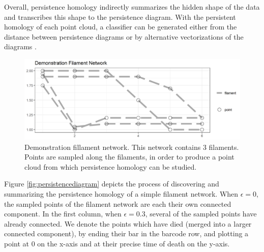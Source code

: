 \documentclass[10pt]{article}
\begin{document}
Overall, persistence homology indirectly summarizes the hidden shape of the data and transcribes this shape to the persistence diagram. With the persistent homology of each point cloud, a classifier can be generated either from the distance \cite{marchese2018signal} between persistence diagrams or by alternative vectorizations of the diagrams \cite{adams2017persistence,bubenik2015statistical,maroulas2018stable}.

\begin{figure}[!htbp]
	\begin{center}
		\includegraphics[width=1\textwidth]{figures/filaments_demo.png}
	\end{center}
	\caption{Demonstration fillament network. This network contains 3 filaments. Points are sampled along the filaments, in order to produce a point cloud from which persistence homology can be studied.}
	\label{fig:demoNetwork}
\end{figure}

Figure \ref{fig:persistencediagram} depicts the process of discovering and summarizing the persistence homology of a simple filament network. When $\epsilon=0$, the sampled points of the filament network are each their own connected component. In the first column, when $\epsilon=0.3$, several of the sampled points have already connected. We denote the points which have died (merged into a larger connected component), by ending their bar in the barcode row, and plotting a point at 0 on the x-axis and at their precise time of death on the y-axis. 
\end{document}
